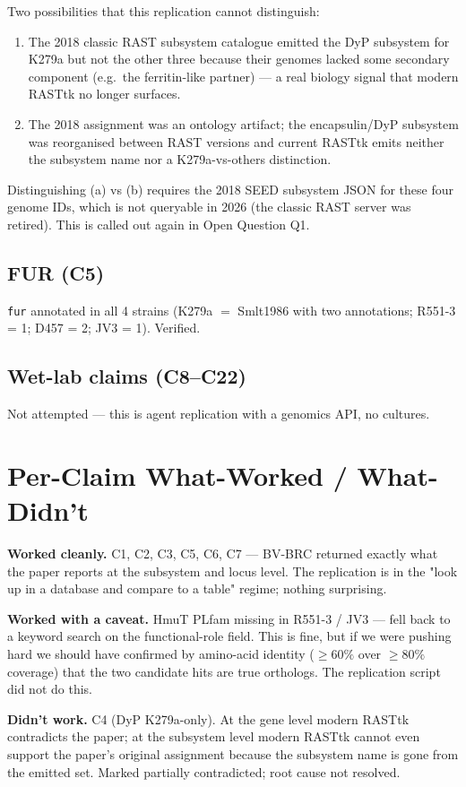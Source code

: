 \documentclass[10pt,a4paper]{article}
\begin{document}
Two possibilities that this replication cannot distinguish:
\begin{enumerate}[label=(\alph*),leftmargin=1.4em]
  \item The 2018 classic RAST subsystem catalogue emitted the DyP subsystem
        for K279a but not the other three because their genomes lacked some
        secondary component (e.g.\ the ferritin-like partner) --- a real
        biology signal that modern RASTtk no longer surfaces.
  \item The 2018 assignment was an ontology artifact; the encapsulin/DyP
        subsystem was reorganised between RAST versions and current RASTtk
        emits neither the subsystem name nor a K279a-vs-others distinction.
\end{enumerate}
Distinguishing (a) vs (b) requires the 2018 SEED subsystem JSON for these four
genome IDs, which is not queryable in 2026 (the classic RAST server was
retired). This is called out again in Open Question Q1.

\subsection{FUR (C5)}
\texttt{fur} annotated in all 4 strains (K279a $=$ Smlt1986 with two
annotations; R551-3 = 1; D457 = 2; JV3 = 1). Verified.

\subsection{Wet-lab claims (C8--C22)}
Not attempted --- this is agent replication with a genomics API, no cultures.

\section{Per-Claim What-Worked / What-Didn't}
\textbf{Worked cleanly.} C1, C2, C3, C5, C6, C7 --- BV-BRC returned exactly
what the paper reports at the subsystem and locus level. The replication is
in the "look up in a database and compare to a table" regime; nothing surprising.

\textbf{Worked with a caveat.} HmuT PLfam missing in R551-3 / JV3 --- fell
back to a keyword search on the functional-role field. This is fine, but if
we were pushing hard we should have confirmed by amino-acid identity
($\ge 60\%$ over $\ge 80\%$ coverage) that the two candidate hits are true
orthologs. The replication script did not do this.

\textbf{Didn't work.} C4 (DyP K279a-only). At the gene level modern RASTtk
contradicts the paper; at the subsystem level modern RASTtk cannot even
support the paper's original assignment because the subsystem name is gone
from the emitted set. Marked partially contradicted; root cause not resolved.
\end{document}
